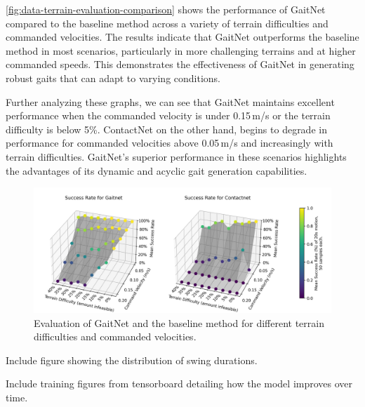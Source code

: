 \autoref{fig:data-terrain-evaluation-comparison} shows the performance
of GaitNet compared to the baseline method across a variety of terrain
difficulties and commanded velocities. The results indicate that GaitNet
outperforms the baseline method in most scenarios, particularly in more
challenging terrains and at higher commanded speeds. This demonstrates
the effectiveness of GaitNet in generating robust gaits that can adapt
to varying conditions.

Further analyzing these graphs, we can see that GaitNet maintains excellent
performance when the commanded velocity is under 0.15\,m/s or the terrain
difficulty is below 5\%. ContactNet on the other hand, begins to degrade in
performance for commanded velocities above 0.05\,m/s and increasingly with
terrain difficulties. GaitNet's superior performance in these scenarios
highlights the advantages of its dynamic and acyclic gait generation
capabilities.

\begin{figure}[H]
  \centering
  \includegraphics[width=\textwidth]{images/data/terrain-evaluation-comparison.png}
  \caption{Evaluation of GaitNet and the baseline method for
  different terrain difficulties and commanded velocities.}
  \label{fig:data-terrain-evaluation-comparison}
\end{figure}

\begin{todo}
  Include figure showing the distribution of swing durations.
\end{todo}

\begin{todo}
  Include training figures from tensorboard detailing how the model
  improves over time.
\end{todo}
